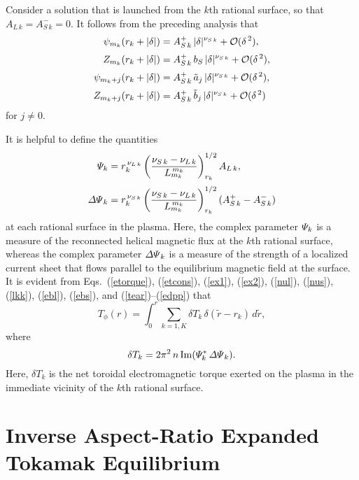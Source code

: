 \documentclass[12pt,prb,aps]{revtex4-1}
\begin{document}
Consider a solution that is launched from the $k$th rational surface, so that $A_{L\,k} = A_{S\,k}^-=0$. It follows from the preceding analysis that
\begin{align}
\psi_{m_k}(r_k+|\delta|) &= A_{S\,k}^+\,|\delta|^{\nu_{S\,k}}+ {\cal O}(\delta^{\,2}),\\[0.5ex]
Z_{m_k}(r_k+|\delta|) &= A_{S\,k}^+\,b_S\,|\delta|^{\nu_{S\,k}}+ {\cal O}(\delta^{\,2}),\\[0.5ex]
\psi_{m_k+j}(r_k+|\delta|)& = A_{S\,k}^+\,\tilde{a}_j\,|\delta|^{\nu_{S\,k}}+ {\cal O}(\delta^{\,2}),\\[0.5ex]
Z_{m_k+j}(r_k+|\delta|) &= A_{S\,k}^+\,\tilde{b}_j\,|\delta|^{\nu_{S\,k}}+ {\cal O}(\delta^{\,2})
\end{align}
for $j\neq 0$. 

It is helpful to define the quantities\,\cite{am1}
\begin{align}\label{Psidef}
{\mit\Psi}_k&= r_k^{\,\nu_{L\,k}}\left(\frac{\nu_{S\,k}-\nu_{L\,k}}{L_{m_k}^{\,{m_k}}}\right)^{1/2}_{r_k} A_{L\,k},\\[0.5ex]
{\mit\Delta\Psi}_k &= r_k^{\,\nu_{S\,k}}\left(\frac{\nu_{S\,k}-\nu_{L\,k}}{L_{m_k}^{\,m_k}}\right)^{1/2}_{r_k} (A_{S\,k}^+ - A_{S\,k}^-)\label{edpp}
\end{align}
at each rational surface in the plasma. Here, the complex parameter ${\mit\Psi}_k$ is a measure of the reconnected helical magnetic flux at the $k$th rational surface, whereas
the complex parameter ${\mit\Delta\Psi}_k$ is a measure of the strength of a localized current sheet that flows parallel to the equilibrium magnetic field at the surface. 
It is evident from Eqs.~(\ref{etorque}), (\ref{etcons}), (\ref{ex1}), (\ref{ex2}), (\ref{nul}), (\ref{nus}), (\ref{lkk}), (\ref{ebl}), (\ref{ebs}), and (\ref{tear})--(\ref{edpp}) that\,\cite{am1,am3}
\begin{equation}\label{e204z}
T_\phi(r) =\int_0^r \sum_{k=1,K}\delta T_k\,\delta(\tilde{r}-r_k)\,d\tilde{r},
\end{equation}
where
\begin{equation}\label{e194t}
\delta T_k = 2\pi^2\,n\,{\rm Im}({\mit\Psi}_k^\ast\,{\mit\Delta\Psi}_k).
\end{equation}
Here, $\delta T_k$ is the net toroidal electromagnetic torque exerted on the plasma in the immediate vicinity of the $k$th rational
surface. 

\section{Inverse Aspect-Ratio Expanded Tokamak Equilibrium}
\end{document}
